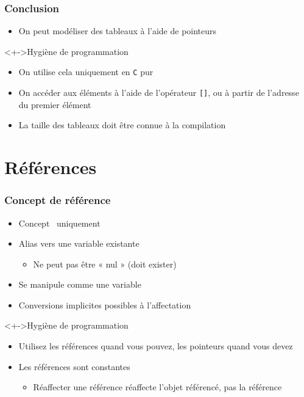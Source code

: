 \begin{frame}
\frametitle{Conclusion}
\begin{itemize}[<+->]
\item On peut modéliser des tableaux à l'aide de pointeurs
\end{itemize}
\begin{block}<+->{Hygiène de programmation}
	\begin{itemize}[<+->]
	\item On utilise cela uniquement en \texttt{C} pur
	\end{itemize}
\end{block}
\begin{itemize}[<+->]
\item On accéder aux éléments à l'aide de l'opérateur \texttt{[]}, ou à partir de l'adresse du premier élément
\item La taille des tableaux doit être connue à la compilation
\end{itemize}
\end{frame}

\section{Références}

\begin{frame}
\frametitle{Concept de référence}
\begin{itemize}[<+->]
\item Concept \cpp\ uniquement
\item Alias vers une variable existante
	\begin{itemize}
	\item Ne peut pas être « nul » (doit exister)
	\end{itemize}
\item Se manipule comme une variable
\item Conversions implicites possibles à l'affectation
\end{itemize}
\begin{block}<+->{Hygiène de programmation}
	\begin{itemize}[<+->]
	\item Utilisez les références quand vous pouvez, les pointeurs quand vous devez
	\end{itemize}
\end{block}
\begin{itemize}[<+->]
\item Les références sont constantes
	\begin{itemize}
	\item Réaffecter une référence réaffecte l'objet référencé, pas la référence
	\end{itemize}
\end{itemize}
\end{frame}

